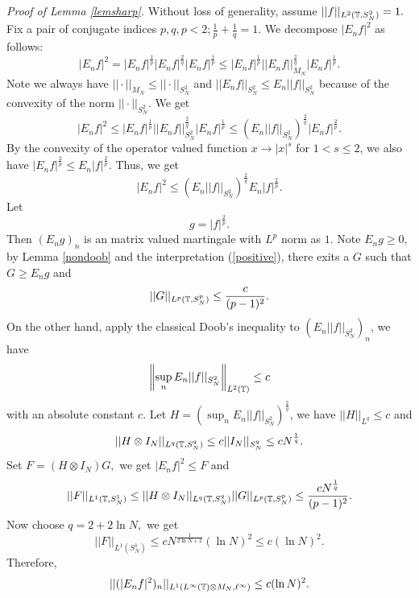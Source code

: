 {\it Proof of Lemma \ref{lemsharp}.} Without loss of generality,
assume $||f||_{L^2({\mathbb T},S_N^2)}=1.$ Fix a pair of conjugate indices
$p,q,p<2;\frac 1p+\frac 1q=1.$ We decompose $|{E_nf}|^2$ as follows:
\[
|{E_nf}|^2=|{E_nf}|^{\frac 1p}|{E_nf}|^{\frac 2q}|{E_nf}|^{\frac
1p}\leq |{E_nf}|^{\frac 1p}||{E_nf}||_{M_N}^{\frac
2q}|{E_nf}|^{\frac 1p}.
\]
Note we always have $||\cdot||_{M_N}\leq||\cdot||_{S^2_N}$ and $
||{E_nf}||_{S_N^2}\leq E_n||f||_{S^2_N}$ because of the convexity of
the norm $||\cdot||_{S^2_N}$. We get
\[
|{E_nf}|^2\leq |{E_nf}|^{\frac 1p}||{E_nf}||_{S^2_N}^{\frac
2q}|{E_nf}|^{\frac 1p}\leq (E_n||f||_{S^2_N})^{\frac
2q}|{E_nf}|^{\frac 2p}.
\]
By the convexity of the operator valued function $x\rightarrow
|x|^s$ for $1<s\leq2$, we also have $|E_nf|^{\frac 2p}\leq
E_n|f|^{\frac 2p}$. Thus, we get
\[
|{E_nf}|^2\leq (E_n||f||_{S^2_N})^{\frac 2q}E_n|{f}|^{\frac 2p}.
\]
 Let
\[
{g}=|f|^{\frac 2p}.
\]
Then $({E_ng})_n$ is an matrix valued martingale with $L^{p}$ norm
as $1.$ Note $E_ng\geq 0$, by Lemma \ref{nondoob} and the
interpretation (\ref{positive}), there exits a $G$ such that $G\geq
{E_ng}$ and
\[
||G||_{L^{p}({\mathbb T},S^p_N)}\leq \frac c{(p-1)^2}.
\]
On the other hand, apply the classical Doob's inequality to
$(E_n||f||_{S_N^2})_n$, we have
\[
\left\|\sup_nE_n||f||_{S_N^2}\right\|_{L^2({\mathbb T})}\leq c
\]
with an absolute constant $c$. Let
$H=(\sup_nE_n||f||_{S_N^2})^{\frac2q}$, we have $||H||_{L^q}\leq c$
and
\[
||H\otimes I_N||_{L^q({\mathbb T},S_N^q)}\leq c||I_N||_{S_N^q}\leq cN^{\frac
1q}.
\]
Set $F=(H\otimes I_N)G,$ we get $|{E_nf}|^2\leq F$ and
\[
||F||_{L^1({\mathbb T},S_N^1)}\leq ||H\otimes
I_N||_{L^q({\mathbb T},S_N^q)}||G||_{L^{p}({\mathbb T},S_N^p)}\leq \frac{cN^{\frac
1q}}{(p-1)^2}.
\]
Now choose $q=2+2{\ln N},$ we get
\[
||F||_{L^1(S_N^1)}\leq cN^{\frac 1{2\ln N+2}}(\ln N)^2\leq c(\ln N)^2.
\]
Therefore,
\[
||(|E_nf|^2)_n||_{L^1(L^\infty({\mathbb T})\otimes M_N,\ell^\infty)}\leq c(\ln
N)^2.
\]

